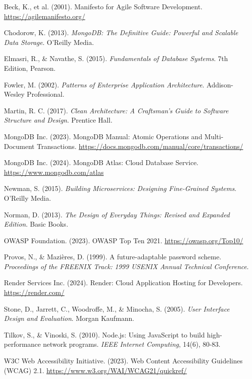 \documentclass[12pt,a4paper]{report}
\begin{document}
\begin{thebibliography}{99}

Beck, K., et al. (2001). Manifesto for Agile Software Development. \url{https://agilemanifesto.org/}

Chodorow, K. (2013). \textit{MongoDB: The Definitive Guide: Powerful and Scalable Data Storage}. O'Reilly Media.

Elmasri, R., \& Navathe, S. (2015). \textit{Fundamentals of Database Systems}. 7th Edition, Pearson.

Fowler, M. (2002). \textit{Patterns of Enterprise Application Architecture}. Addison-Wesley Professional.

Martin, R. C. (2017). \textit{Clean Architecture: A Craftsman's Guide to Software Structure and Design}. Prentice Hall.

MongoDB Inc. (2023). MongoDB Manual: Atomic Operations and Multi-Document Transactions. \url{https://docs.mongodb.com/manual/core/transactions/}

MongoDB Inc. (2024). MongoDB Atlas: Cloud Database Service. \url{https://www.mongodb.com/atlas}

Newman, S. (2015). \textit{Building Microservices: Designing Fine-Grained Systems}. O'Reilly Media.

Norman, D. (2013). \textit{The Design of Everyday Things: Revised and Expanded Edition}. Basic Books.

OWASP Foundation. (2023). OWASP Top Ten 2021. \url{https://owasp.org/Top10/}

Provos, N., \& Mazières, D. (1999). A future-adaptable password scheme. \textit{Proceedings of the FREENIX Track: 1999 USENIX Annual Technical Conference}.

Render Services Inc. (2024). Render: Cloud Application Hosting for Developers. \url{https://render.com/}

Stone, D., Jarrett, C., Woodroffe, M., \& Minocha, S. (2005). \textit{User Interface Design and Evaluation}. Morgan Kaufmann.

Tilkov, S., \& Vinoski, S. (2010). Node.js: Using JavaScript to build high-performance network programs. \textit{IEEE Internet Computing}, 14(6), 80-83.

W3C Web Accessibility Initiative. (2023). Web Content Accessibility Guidelines (WCAG) 2.1. \url{https://www.w3.org/WAI/WCAG21/quickref/}

\end{thebibliography}
\end{document}
